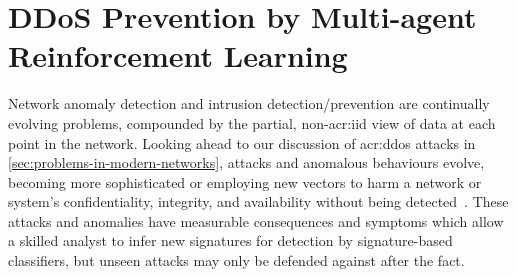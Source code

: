 \chapter{DDoS Prevention by Multi-agent Reinforcement Learning}\label{chap:ddos-rl}
Network anomaly detection and intrusion detection/prevention are continually evolving problems, compounded by the partial, non-\gls{acr:iid} view of data at each point in the network.
Looking ahead to our discussion of \gls{acr:ddos} attacks in \cref{sec:problems-in-modern-networks}, attacks and anomalous behaviours evolve, becoming more sophisticated or employing new vectors to harm a network or system's confidentiality, integrity, and availability without being detected~\parencite{DBLP:journals/comsur/BhuyanBK14}.
These attacks and anomalies have measurable consequences and symptoms which allow a skilled analyst to infer new signatures for detection by signature-based classifiers, but unseen attacks may only be defended against after the fact.


